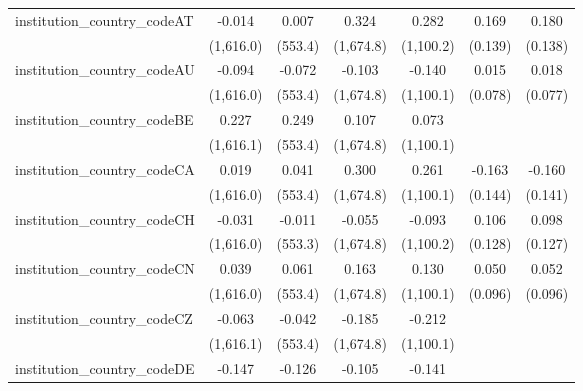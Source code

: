 \begin{tabular}{lcccccc}
   institution\_country\_codeAT          & -0.014         & 0.007          & 0.324         & 0.282         & 0.169        & 0.180\\   
                                         & (1,616.0)      & (553.4)        & (1,674.8)     & (1,100.2)     & (0.139)      & (0.138)\\   
   institution\_country\_codeAU          & -0.094         & -0.072         & -0.103        & -0.140        & 0.015        & 0.018\\   
                                         & (1,616.0)      & (553.4)        & (1,674.8)     & (1,100.1)     & (0.078)      & (0.077)\\   
   institution\_country\_codeBE          & 0.227          & 0.249          & 0.107         & 0.073         &              &   \\   
                                         & (1,616.1)      & (553.4)        & (1,674.8)     & (1,100.1)     &              &   \\   
   institution\_country\_codeCA          & 0.019          & 0.041          & 0.300         & 0.261         & -0.163       & -0.160\\   
                                         & (1,616.0)      & (553.4)        & (1,674.8)     & (1,100.1)     & (0.144)      & (0.141)\\   
   institution\_country\_codeCH          & -0.031         & -0.011         & -0.055        & -0.093        & 0.106        & 0.098\\   
                                         & (1,616.0)      & (553.3)        & (1,674.8)     & (1,100.2)     & (0.128)      & (0.127)\\   
   institution\_country\_codeCN          & 0.039          & 0.061          & 0.163         & 0.130         & 0.050        & 0.052\\   
                                         & (1,616.0)      & (553.4)        & (1,674.8)     & (1,100.1)     & (0.096)      & (0.096)\\   
   institution\_country\_codeCZ          & -0.063         & -0.042         & -0.185        & -0.212        &              &   \\   
                                         & (1,616.1)      & (553.4)        & (1,674.8)     & (1,100.1)     &              &   \\   
   institution\_country\_codeDE          & -0.147         & -0.126         & -0.105        & -0.141        &              &   \\   

\end{tabular}
